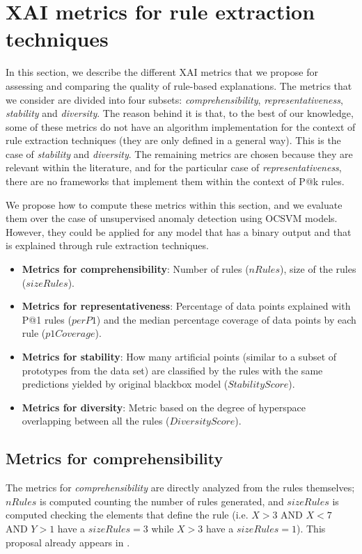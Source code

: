 \section{XAI metrics for rule extraction techniques}\label{sec:RuleExtractionMetrics}
In this section, we describe the different XAI metrics that we propose for assessing and comparing the quality of rule-based explanations. The metrics that we consider are divided into four subsets: \textit{comprehensibility}, \textit{representativeness}, \textit{stability} and \textit{diversity}. The reason behind it is that, to the best of our knowledge, some of these metrics do not have an algorithm implementation for the context of rule extraction techniques (they are only defined in a general way). This is the case of \textit{stability} and \textit{diversity}. The remaining metrics are chosen because they are relevant within the literature, and for the particular case of \textit{representativeness}, there are no frameworks that implement them within the context of P@k rules. 

We propose how to compute these metrics within this section, and we evaluate them over the case of unsupervised anomaly detection using OCSVM models. However, they could be applied for any model that has a binary output and that is explained through rule extraction techniques.

\begin{itemize}
    \item \textbf{Metrics for comprehensibility}: Number of rules ($nRules$), size of the rules ($sizeRules$).
    \item \textbf{Metrics for representativeness}: Percentage of data points explained with P@1 rules ($perP1$) and the median percentage coverage of data points by each rule ($p1Coverage$).
    \item  \textbf{Metrics for stability}: How many artificial points (similar to a subset of prototypes from the data set) are classified by the rules with the same predictions yielded by original blackbox model ($StabilityScore$).
    \item \textbf{Metrics for diversity}: Metric based on the degree of hyperspace overlapping between all the rules ($DiversityScore$).
\end{itemize}

\subsection{Metrics for comprehensibility}\label{subsec:RuleExtractionComprehensibility}
The metrics for \textit{comprehensibility} are directly analyzed from the rules themselves; $nRules$ is computed counting the number of rules generated, and $sizeRules$ is computed checking the elements that define the rule (i.e. $X > 3$ AND $X < 7$ AND $Y > 1$ have a $sizeRules=3$ while $X > 3$ have a $sizeRules=1$). This proposal already appears in \parencite{barakat2010rule}.

